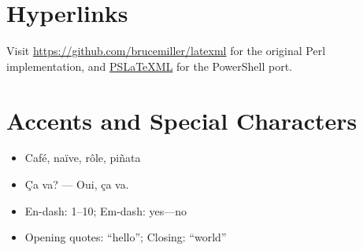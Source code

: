 \documentclass[12pt]{article}
\begin{document}
\section{Hyperlinks}

Visit \url{https://github.com/brucemiller/latexml} for the original Perl
implementation, and \href{https://github.com/esrklncc793/PSLaTeXML}{PSLaTeXML}
for the PowerShell port.

\section{Accents and Special Characters}

\begin{itemize}
  \item Caf\'{e}, na\"{i}ve, r\^{o}le, pi\~{n}ata
  \item \c{C}a va? --- Oui, \c{c}a va.
  \item En-dash: 1--10; Em-dash: yes---no
  \item Opening quotes: ``hello''; Closing: ``world''
\end{itemize}
\end{document}
